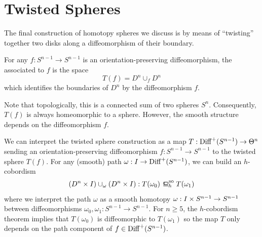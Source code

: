 \pagebreak
\section{Twisted Spheres}\label{sec:twisted-spheres}
The final construction of homotopy spheres we discuss is by means of ``twisting'' together two disks along a diffeomorphism of their boundary.

\begin{definition}
	For any $f : S^{n-1}\to S^{n-1}$ is an orientation-preserving diffeomorphism, the  associated to $f$ is the space
	\[
		T(f) = D^n\cup_f D^n
	\]
	which identifies the boundaries of $D^n$ by the diffeomorphism $f$.
\end{definition}

Note that topologically, this is a connected sum of two spheres $S^n$. Consequently, $T(f)$ is always homeomorphic to a sphere. However, the smooth structure depends on the diffeomorphism $f$.

We can interpret the twisted sphere construction as a map $T: \Diff^+(S^{n-1})\to \Theta^n$ sending an orientation-preserving diffeomorphism $f : S^{n-1} \to S^{n-1}$ to the twisted sphere $T(f)$. For any (smooth) path $\omega : I \to \Diff^+(S^{n-1})$, we can build an $h$-cobordism 
	\[ (D^n\times I)\cup_\omega (D^n\times I) : T(\omega_0) \sohbord T(\omega_1)\]
	where we interpret the path $\omega$ as a smooth homotopy $\omega : I\times S^{n-1}\to\S^{n-1}$ between diffeomorphisms $\omega_0, \omega_1 : S^{n-1} \to S^{n-1}$. For $n\geq 5$, the $h$-cobordism theorem implies that $T(\omega_0)$ is diffeomorphic to $T(\omega_1)$ so the map $T$ only depends on the path component of $f\in \Diff^+(S^{n-1})$.

